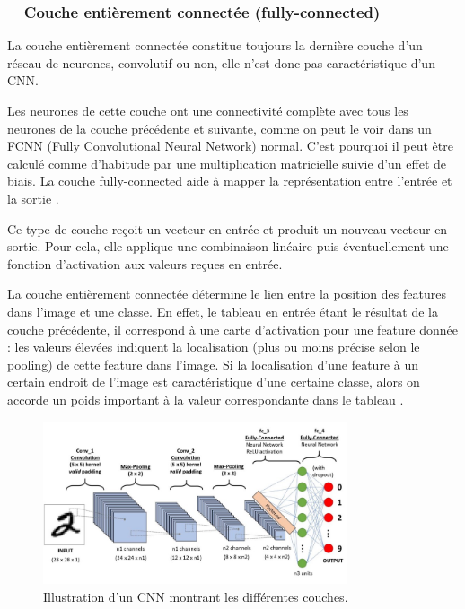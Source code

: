 	
	
	
	\subsubsection*{\qquad \textbullet \ \ Couche entièrement connectée (fully-connected)}
	
	La couche entièrement connectée constitue toujours la dernière couche d'un réseau de neurones, convolutif ou non, elle n'est donc pas caractéristique d'un CNN. 
	
	Les neurones de cette couche ont une connectivité complète avec tous les neurones de la couche précédente et suivante, comme on peut le voir dans un FCNN (Fully Convolutional Neural Network) normal. C'est pourquoi il peut être calculé comme d'habitude par une multiplication matricielle suivie d'un effet de biais. La couche fully-connected aide à mapper la représentation entre l'entrée et la sortie \cite{goodfellow2016deep}.
	
	Ce type de couche reçoit un vecteur en entrée et produit un nouveau vecteur en sortie. Pour cela, elle applique une combinaison linéaire puis éventuellement une fonction d'activation aux valeurs reçues en entrée.
	
	La couche entièrement connectée détermine le lien entre la position des features dans l'image et une classe. En effet, le tableau en entrée étant le résultat de la couche précédente, il correspond à une carte d'activation pour une feature donnée : les valeurs élevées indiquent la localisation (plus ou moins précise selon le pooling) de cette feature dans l'image. Si la localisation d'une feature à un certain endroit de l'image est caractéristique d'une certaine classe, alors on accorde un poids important à la valeur correspondante dans le tableau \cite{shin2016deep}.
	
	\begin{figure}[H]%
		\centering
		\includegraphics[width=0.8\textwidth]{images/cnn_image1}
		\caption{Illustration d'un CNN montrant les différentes couches.}
		\label{fig:cnn_}
	\end{figure}
	
